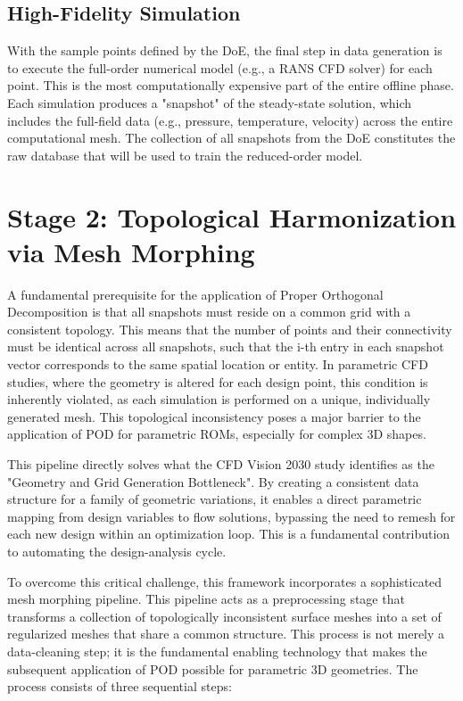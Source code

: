 \documentclass[dsc, EN]{ufabcFHZh}
\begin{document}
\subsection{High-Fidelity Simulation}

With the sample points defined by the DoE, the final step in data generation is to execute the full-order numerical model (e.g., a RANS CFD solver) for each point. This is the most computationally expensive part of the entire offline phase. Each simulation produces a "snapshot" of the steady-state solution, which includes the full-field data (e.g., pressure, temperature, velocity) across the entire computational mesh. The collection of all snapshots from the DoE constitutes the raw database that will be used to train the reduced-order model. 

\section{Stage 2: Topological Harmonization via Mesh Morphing}

A fundamental prerequisite for the application of Proper Orthogonal Decomposition is that all snapshots must reside on a common grid with a consistent topology. This means that the number of points and their connectivity must be identical across all snapshots, such that the i-th entry in each snapshot vector corresponds to the same spatial location or entity. In parametric CFD studies, where the geometry is altered for each design point, this condition is inherently violated, as each simulation is performed on a unique, individually generated mesh. This topological inconsistency poses a major barrier to the application of POD for parametric ROMs, especially for complex 3D shapes. 

This pipeline directly solves what the CFD Vision 2030 study identifies as the "Geometry and Grid Generation Bottleneck". By creating a consistent data structure for a family of geometric variations, it enables a direct parametric mapping from design variables to flow solutions, bypassing the need to remesh for each new design within an optimization loop. This is a fundamental contribution to automating the design-analysis cycle.   

To overcome this critical challenge, this framework incorporates a sophisticated mesh morphing pipeline. This pipeline acts as a preprocessing stage that transforms a collection of topologically inconsistent surface meshes into a set of regularized meshes that share a common structure. This process is not merely a data-cleaning step; it is the fundamental enabling technology that makes the subsequent application of POD possible for parametric 3D geometries. The process consists of three sequential steps:
\end{document}

